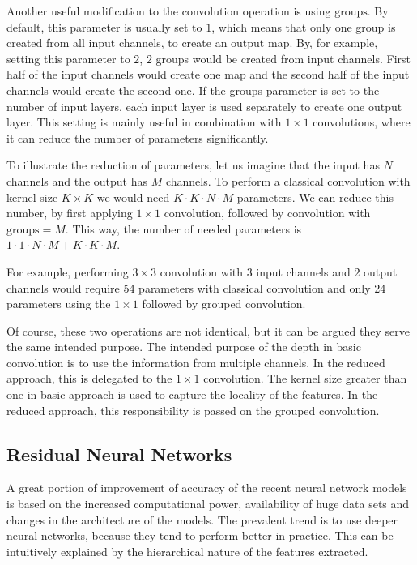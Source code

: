 Another useful modification to the convolution operation is using $\text{groups}$.
By default, this parameter is usually set to $1$, which means that only one group is created from all input channels, to create an output map.
By, for example, setting this parameter to $2$, $2$ groups would be created from input channels.
First half of the input channels would create one map and the second half of the input channels would create the second one.
If the groups parameter is set to the number of input layers, each input layer is used separately to create one output layer.
This setting is mainly useful in combination with $1 \times 1$ convolutions, where it can reduce the number of parameters significantly. 

To illustrate the reduction of parameters, let us imagine that the input has $N$ channels and the output has $M$ channels.
To perform a classical convolution with kernel size $K \times K$ we would need $K \cdot K \cdot N \cdot M$ parameters.
We can reduce this number, by first applying $1 \times 1$ convolution, followed by convolution with $\text{groups} = M$.
This way, the number of needed parameters is $1 \cdot 1 \cdot N \cdot M + K \cdot K \cdot M$.

For example, performing $3 \times 3$ convolution with $3$ input channels and $2$ output channels would require 54 parameters with classical convolution and only 24 parameters using the $1 \times 1$ followed by grouped convolution.

Of course, these two operations are not identical, but it can be argued they serve the same intended purpose.
The intended purpose of the depth in basic convolution is to use the information from multiple channels.
In the reduced approach, this is delegated to the $1 \times 1$ convolution.
The kernel size greater than one in basic approach is used to capture the locality of the features.
In the reduced approach, this responsibility is passed on the grouped convolution. 

\subsection{Residual Neural Networks}
A great portion of improvement of accuracy of the recent neural network models is based on the increased computational power, availability of huge data sets and changes in the architecture of the models.
The prevalent trend is to use deeper neural networks, because they tend to perform better in practice.
This can be intuitively explained by the hierarchical nature of the features extracted.

